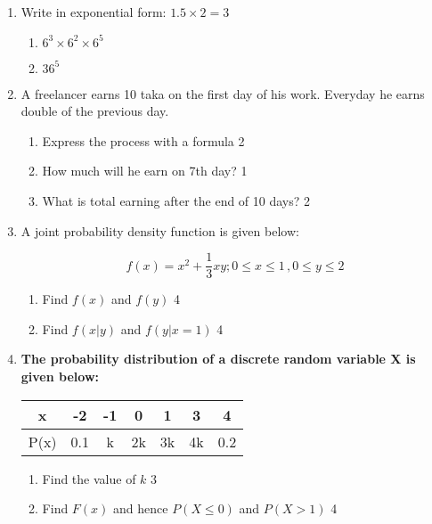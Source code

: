 \documentclass[10pt]{article}
\begin{document}
\begin{enumerate}

\item Write in exponential form: \hfill $1.5 \times 2 = 3$

\begin{enumerate}

\item $6^3 \times 6^2 \times 6^5$ 
\item $36^5$ 

\end{enumerate}

\item A freelancer earns 10 taka on the first day of his work. Everyday he earns double of the previous day. 

\begin{enumerate}
\item Express the process with a formula \hfill 2
\item How much will he earn on 7th day? \hfill 1
\item What is total earning after the end of 10 days? \hfill 2
\end{enumerate}

\item A joint probability density function is given below:

\[f(x) = x^2+ \frac13 xy; 0\le x \le 1\,, 0\le y \le 2\]

\begin{enumerate}

\item Find $f(x)$ and $f(y)$ \hfill 4
\item Find $f(x|y)$ and $f(y|x=1)$ \hfill 4

\end{enumerate}

\item \textbf{The probability distribution of a discrete random variable X is given below:} 

	  \begin{table}[h]
	  \begin{center}
\begin{tabular}{c|cccccc}
x    & -2   & -1 & 0   & 1 & 3 & 4   \\ \hline
P(x) & 0.1 & k & 2k & 3k & 4k & 0.2
\end{tabular} 
\end{center}	
\end{table}

\begin{enumerate}

\item Find the value of $k$ \hfill 3
\item Find $F(x)$ and hence $P(X \le 0)$ and $P(X > 1)$ \hfill 4

\end{enumerate}

\end{enumerate}
\end{document}
